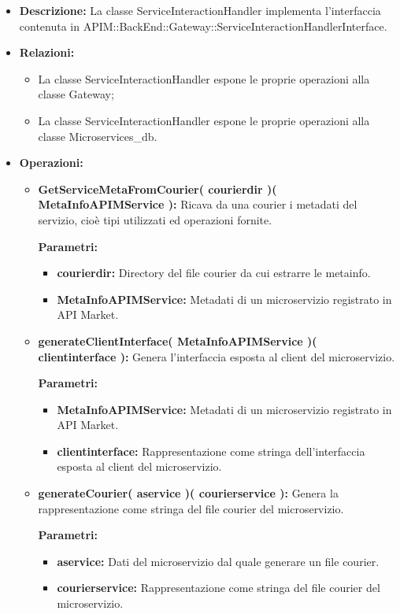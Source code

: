 \begin{itemize}
	\item \textbf{Descrizione:} La classe ServiceInteractionHandler implementa l'interfaccia contenuta in APIM::BackEnd::Gateway::ServiceInteractionHandlerInterface.
	\item \textbf{Relazioni:}
		\begin{itemize}
			\item La classe ServiceInteractionHandler espone le proprie operazioni alla classe Gateway;
			\item La classe ServiceInteractionHandler espone le proprie operazioni alla classe Microservices\_db.
		\end{itemize}
	\item \textbf{Operazioni:}
		\begin{itemize}
			\item \textbf{GetServiceMetaFromCourier( courierdir )( MetaInfoAPIMService ):} Ricava da una courier i metadati del servizio, cioè tipi utilizzati ed operazioni fornite.
				\begin{description}
    				\item[\textbf{Parametri:}]
				\end{description}
				\begin{itemize}
					\item \textbf{courierdir:} Directory del file courier da cui estrarre le metainfo.
					\item \textbf{MetaInfoAPIMService:} Metadati di un microservizio registrato in API Market.
				\end{itemize}
			\item \textbf{generateClientInterface( MetaInfoAPIMService )( clientinterface ):} Genera l'interfaccia esposta al client del microservizio.
				\begin{description}
    				\item[\textbf{Parametri:}]
				\end{description}
				\begin{itemize}
					\item \textbf{MetaInfoAPIMService:} Metadati di un microservizio registrato in API Market.
					\item \textbf{clientinterface:} Rappresentazione come stringa dell'interfaccia esposta al client del microservizio.
				\end{itemize}
			\item \textbf{generateCourier( aservice )( courierservice ):} Genera la rappresentazione come stringa del file courier del microservizio.
				\begin{description}
    				\item[\textbf{Parametri:}]
				\end{description}
				\begin{itemize}
					\item \textbf{aservice:} Dati del microservizio dal quale generare un file courier.
					\item \textbf{courierservice:} Rappresentazione come stringa del file courier del microservizio.
				\end{itemize}
		\end{itemize}
\end{itemize}

